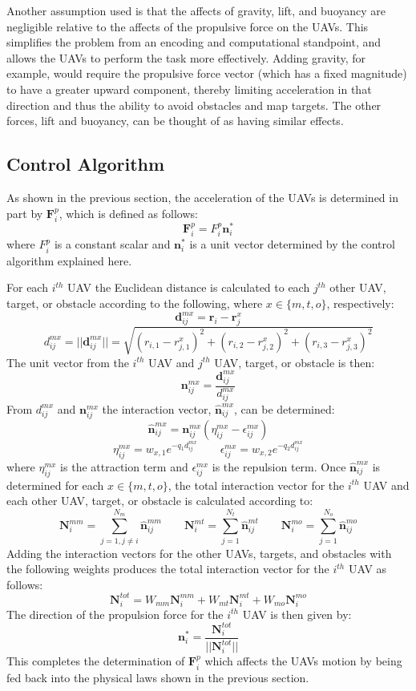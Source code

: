 \documentclass[a4paper,12pt]{report}
\begin{document}
Another assumption used is that the affects of gravity, lift, and buoyancy are negligible relative to the affects of the propulsive force on the UAVs. This simplifies the problem from an encoding and computational standpoint, and allows the UAVs to perform the task more effectively. Adding gravity, for example, would require the propulsive force vector (which has a fixed magnitude) to have a greater upward component, thereby limiting acceleration in that direction and thus the ability to avoid obstacles and map targets. The other forces, lift and buoyancy, can be thought of as having similar effects.
 
\subsection{Control Algorithm}
As shown in the previous section, the acceleration of the UAVs is determined in part by $\bm{F}^p_i$, which is defined as follows:
$$\bm{F}^p_i = F^p_i\bm{n}^*_i$$
where $F^p_i$ is a constant scalar and $\bm{n}^*_i$ is a unit vector determined by the control algorithm explained here.

For each $i^{th}$ UAV the Euclidean distance is calculated to each $j^{th}$ other UAV, target, or obstacle according to the following, where $x \in \{m, t, o\}$, respectively:
$$\bm{d}^{mx}_{ij} = \bm{r}_i - \bm{r}^x_j$$
$$d^{mx}_{ij} = ||\bm{d}^{mx}_{ij}|| = \sqrt{(r_{i,1} - r^x_{j,1})^2 + (r_{i,2} - r^x_{j,2})^2 + (r_{i,3} - r^x_{j,3})^2}$$
The unit vector from the $i^{th}$ UAV and $j^{th}$ UAV, target, or obstacle is then:
$$\bm{n}^{mx}_{ij} = \frac{\bm{d}^{mx}_{ij}}{d^{mx}_{ij}}$$
From $d^{mx}_{ij}$ and $\bm{n}^{mx}_{ij}$ the interaction vector, $\hat{\bm{n}}^{mx}_{ij}$, can be determined:
$$\hat{\bm{n}}^{mx}_{ij} = \bm{n}^{mx}_{ij} (\eta^{mx}_{ij} - \epsilon^{mx}_{ij})$$
$$\eta^{mx}_{ij} = w_{x, 1}e^{-q_1d^{mx}_{ij}} \qquad \epsilon^{mx}_{ij} = w_{x, 2}e^{-q_2d^{mx}_{ij}}$$
where $\eta^{mx}_{ij}$ is the attraction term and $\epsilon^{mx}_{ij}$ is the repulsion term. Once $\hat{\bm{n}}^{mx}_{ij}$ is determined for each $x \in \{m, t, o\}$, the total interaction vector for the $i^{th}$ UAV and each other UAV, target, or obstacle is calculated according to:
$$\bm{N}^{mm}_i = \sum_{j=1, j\neq i}^{N_m}\hat{\bm{n}}_{ij}^{mm} \qquad \bm{N}^{mt}_i = \sum_{j=1}^{N_t}\hat{\bm{n}}_{ij}^{mt} \qquad \bm{N}^{mo}_i = \sum_{j=1}^{N_o}\hat{\bm{n}}_{ij}^{mo}$$
Adding the interaction vectors for the other UAVs, targets, and obstacles with the following weights produces the total interaction vector for the $i^{th}$ UAV as follows:
$$ \bm{N}^{tot}_i = W_{mm}\bm{N}^{mm}_i + W_{mt}\bm{N}^{mt}_i + W_{mo}\bm{N}^{mo}_i $$
The direction of the propulsion force for the $i^{th}$ UAV is then given by:
$$  \bm{n}^*_i = \frac{\bm{N}^{tot}_i}{||\bm{N}^{tot}_i||} $$
This completes the determination of $\bm{F}_i^p$ which affects the UAVs motion by being fed back into the physical laws shown in the previous section.
\end{document}
